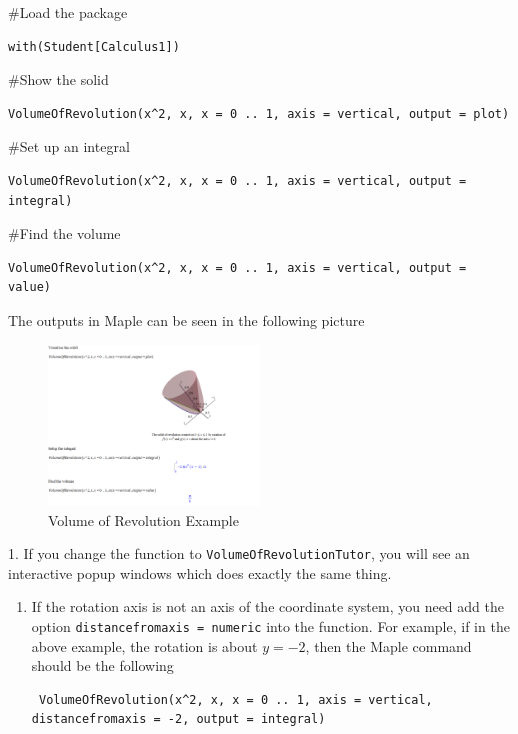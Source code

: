 \documentclass[
  en,11pt,simple]{elegantbook}
\begin{document}
\begin{solution}
{}

\#Load the package

\begin{verbatim}
with(Student[Calculus1])
\end{verbatim}

\#Show the solid

\begin{verbatim}
VolumeOfRevolution(x^2, x, x = 0 .. 1, axis = vertical, output = plot)
\end{verbatim}

\#Set up an integral

\begin{verbatim}
VolumeOfRevolution(x^2, x, x = 0 .. 1, axis = vertical, output = integral)
\end{verbatim}

\#Find the volume

\begin{verbatim}
VolumeOfRevolution(x^2, x, x = 0 .. 1, axis = vertical, output = value)
\end{verbatim}

The outputs in Maple can be seen in the following picture

\begin{figure}
\centering
\includegraphics[width=0.5\textwidth,height=\textheight]{figs/VolOfRev-Example1.png}
\caption{Volume of Revolution Example}
\end{figure}
\end{solution}

\begin{remark}
{}1. If you change the function to \texttt{VolumeOfRevolutionTutor}, you will see an interactive popup windows which does exactly the same thing.

\begin{enumerate}
\def\labelenumi{\arabic{enumi}.}
\setcounter{enumi}{1}
\item
  If the rotation axis is not an axis of the coordinate system, you need add the option \texttt{distancefromaxis\ =\ numeric} into the function. For example, if in the above example, the rotation is about \(y=-2\), then the Maple command should be the following

\begin{verbatim}
 VolumeOfRevolution(x^2, x, x = 0 .. 1, axis = vertical, distancefromaxis = -2, output = integral)
\end{verbatim}
\end{enumerate}
\end{remark}
\end{document}
